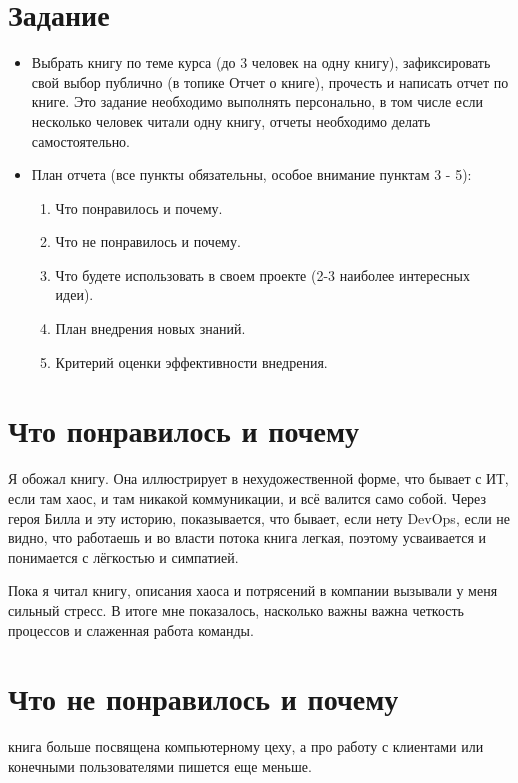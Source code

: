 \documentclass[14pt, russian]{matmex-diploma-custom}
\begin{document}

\maketitle
\section*{Задание}
\begin{itemize}
    \item Выбрать книгу по теме курса (до 3 человек на одну книгу), зафиксировать свой выбор публично (в топике Отчет о книге), прочесть и написать отчет по книге. Это задание необходимо выполнять персонально, в том числе если несколько человек читали одну книгу, отчеты необходимо делать самостоятельно.
    \item План отчета (все пункты обязательны, особое внимание пунктам 3 - 5):
    \begin{enumerate}
        \item Что понравилось и почему.
        \item Что не понравилось и почему.
        \item Что будете использовать в своем проекте (2-3 наиболее интересных идеи).
        \item План внедрения новых знаний.
        \item Критерий оценки эффективности внедрения.
    \end{enumerate}
\end{itemize}

\section{Что понравилось и почему}

Я обожал книгу. Она иллюстрирует в нехудожественной форме, что бывает с ИТ, если там хаос, и там никакой коммуникации, и всё валится само собой.
Через героя Билла и эту историю, показывается, что бывает, если нету DevOps, если не видно, что работаешь и во власти потока книга легкая, поэтому усваивается и понимается с лёгкостью и симпатией.

Пока я читал книгу, описания хаоса и потрясений в компании вызывали у меня сильный стресс.
В итоге мне показалось, насколько важны важна четкость процессов и слаженная работа команды.

\section{Что не понравилось и почему}
книга больше посвящена компьютерному цеху, а про работу с клиентами или конечными пользователями пишется еще меньше.
\end{document}
